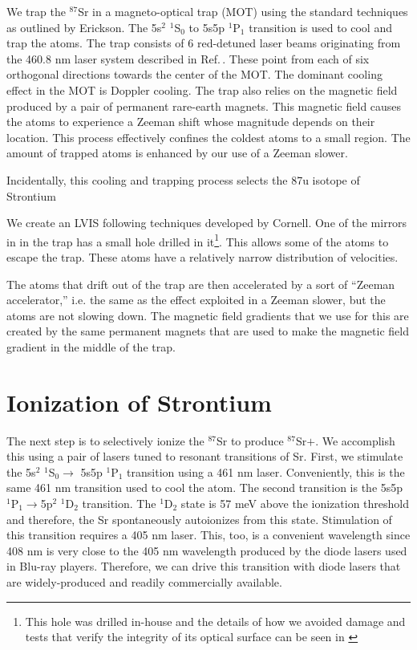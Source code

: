 We trap the $^{87}$Sr in a magneto-optical trap (MOT) using the standard techniques as outlined by Erickson\cite{cjeDiss}. 
The 5s$^2$ $^1$S$_0$ to 5s5p $^1$P$_1$ transition is used to cool and trap the atoms. 
The trap consists of 6 red-detuned laser beams originating from the 460.8 nm laser system described in Ref.\,\cite{cjeDiss}. These point from each of six orthogonal directions towards the center of the MOT. The dominant cooling effect in the MOT is Doppler cooling. 
The trap also relies on the magnetic field produced by a pair of permanent rare-earth magnets. This magnetic field causes the atoms to experience a Zeeman shift whose magnitude depends on their location. This process effectively confines the coldest atoms to a small region. The amount of trapped atoms is enhanced by our use of a Zeeman slower. 

Incidentally, this cooling and trapping process selects the 87u isotope of Strontium%

We create an LVIS \cite{cjeDiss} following techniques developed by Cornell\cite{LVIS}. One of the mirrors in in the trap has a small hole drilled in it\footnote{This hole was drilled in-house and the details of how we avoided damage and tests that verify the integrity of its optical surface can be seen in \cite{cjeDiss}}. This allows some of the atoms to escape the trap. These atoms have a relatively narrow distribution of velocities. %


The atoms that drift out of the trap are then accelerated by a sort of ``Zeeman accelerator,'' i.e. the same as the effect exploited in a Zeeman slower, but the atoms are not slowing down. The magnetic field gradients that we use for this are created by the same permanent magnets that are used to make the magnetic field gradient in the middle of the trap.

\section{Ionization of Strontium}
 
The next step is to selectively ionize the $^{87}$Sr to produce $^{87}$Sr$+$. We accomplish this using a pair of lasers tuned to resonant transitions of Sr. First, we stimulate the 5s$^2$ $^1$S$_0 \rightarrow$ 5s5p $^1$P$_1$ transition using a 461 nm laser. Conveniently, this is the same 461 nm transition used to cool the atom. The second transition is the 5s5p $^1$P$_1\rightarrow$5p$^2$ $^1$D$_2$ transition. The $^1$D$_2$ state is 57 meV above the ionization threshold \cite{NSFprop} and therefore, the Sr spontaneously autoionizes from this state. Stimulation of this transition requires a 405 nm laser. This, too, is a convenient wavelength since 408 nm is very close to the 405 nm wavelength produced by the diode lasers used in Blu-ray players. Therefore, we can drive this transition with diode lasers that are widely-produced and readily commercially available. 


